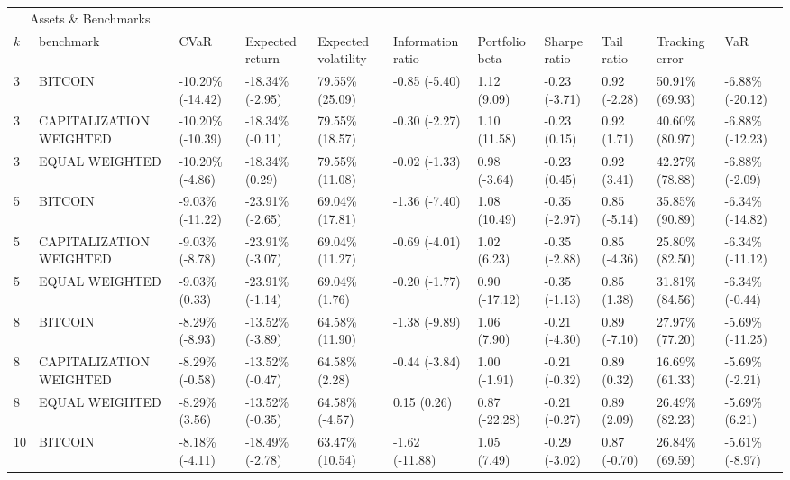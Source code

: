 \documentclass{article}
\begin{document}
\begin{landscape}
\begin{table}[H]
  \centering
  \begin{tabular}{p{0.4cm}|p{3cm}|p{1.65cm}|p{1.65cm}|p{1.65cm}|p{1.65cm}|p{1.65cm}|p{1.65cm}|p{1.65cm}|p{1.65cm}|p{1.65cm}}%
    \toprule
    \multicolumn{2}{c}{Assets \& Benchmarks}                   \\
    \cmidrule(r){1-2}
    $k$ & benchmark & CVaR & Expected return & Expected volatility&Information ratio&Portfolio beta&Sharpe ratio&Tail ratio&Tracking error&VaR\\
    \midrule 
3&BITCOIN&-10.20\% (-14.42)&-18.34\% (-2.95)&79.55\% (25.09)&-0.85 (-5.40)&1.12 (9.09)&-0.23 (-3.71)&0.92 (-2.28)&50.91\% (69.93)&-6.88\% (-20.12)
\\ 
3&CAPITALIZATION WEIGHTED&-10.20\% (-10.39)&-18.34\% (-0.11)&79.55\% (18.57)&-0.30 (-2.27)&1.10 (11.58)&-0.23 (0.15)&0.92 (1.71)&40.60\% (80.97)&-6.88\% (-12.23)
\\ 
3&EQUAL WEIGHTED&-10.20\% (-4.86)&-18.34\% (0.29)&79.55\% (11.08)&-0.02 (-1.33)&0.98 (-3.64)&-0.23 (0.45)&0.92 (3.41)&42.27\% (78.88)&-6.88\% (-2.09)
\\ 
5&BITCOIN&-9.03\% (-11.22)&-23.91\% (-2.65)&69.04\% (17.81)&-1.36 (-7.40)&1.08 (10.49)&-0.35 (-2.97)&0.85 (-5.14)&35.85\% (90.89)&-6.34\% (-14.82)
\\ 
5&CAPITALIZATION WEIGHTED&-9.03\% (-8.78)&-23.91\% (-3.07)&69.04\% (11.27)&-0.69 (-4.01)&1.02 (6.23)&-0.35 (-2.88)&0.85 (-4.36)&25.80\% (82.50)&-6.34\% (-11.12)
\\ 
5&EQUAL WEIGHTED&-9.03\% (0.33)&-23.91\% (-1.14)&69.04\% (1.76)&-0.20 (-1.77)&0.90 (-17.12)&-0.35 (-1.13)&0.85 (1.38)&31.81\% (84.56)&-6.34\% (-0.44)
\\ 
8&BITCOIN&-8.29\% (-8.93)&-13.52\% (-3.89)&64.58\% (11.90)&-1.38 (-9.89)&1.06 (7.90)&-0.21 (-4.30)&0.89 (-7.10)&27.97\% (77.20)&-5.69\% (-11.25)
\\ 
8&CAPITALIZATION WEIGHTED&-8.29\% (-0.58)&-13.52\% (-0.47)&64.58\% (2.28)&-0.44 (-3.84)&1.00 (-1.91)&-0.21 (-0.32)&0.89 (0.32)&16.69\% (61.33)&-5.69\% (-2.21)
\\ 
8&EQUAL WEIGHTED&-8.29\% (3.56)&-13.52\% (-0.35)&64.58\% (-4.57)&0.15 (0.26)&0.87 (-22.28)&-0.21 (-0.27)&0.89 (2.09)&26.49\% (82.23)&-5.69\% (6.21)
\\ 
10&BITCOIN&-8.18\% (-4.11)&-18.49\% (-2.78)&63.47\% (10.54)&-1.62 (-11.88)&1.05 (7.49)&-0.29 (-3.02)&0.87 (-0.70)&26.84\% (69.59)&-5.61\% (-8.97)
\\ 

\end{tabular}
\end{table}
\end{landscape}
\end{document}

